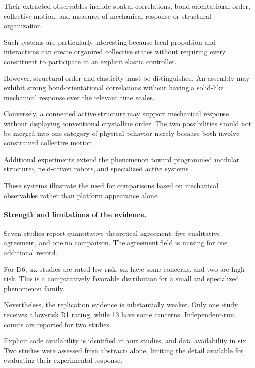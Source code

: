 Their extracted observables
include spatial
correlations,
bond-orientational order,
collective motion,
and measures of
mechanical response
or structural
organization.

Such systems are
particularly interesting
because local propulsion
and interactions
can create organized
collective states
without requiring
every constituent
to participate
in an explicit
elastic controller.

However, structural
order and elasticity
must be distinguished.
An assembly may
exhibit strong
bond-orientational
correlations without
having a solid-like
mechanical response
over the relevant
time scales.

Conversely, a connected
active structure
may support
mechanical response
without displaying
conventional crystalline
order. The two
possibilities should
not be merged
into one category
of physical behavior
merely because both
involve constrained
collective motion.

Additional experiments
extend the phenomenon
toward programmed
modular structures,
field-driven robots,
and specialized
active systems
\cite{Zhang2026anisotropicshapesh,Wang2021emergentfielddrive,Bo2026threephasesofodd}.

These systems illustrate
the need for comparisons
based on mechanical
observables rather
than platform
appearance alone.

\paragraph*{Strength and limitations of the evidence.}

Seven studies report
quantitative theoretical
agreement, five
qualitative agreement,
and one no comparison.
The agreement field
is missing for
one additional record.

For D6, six studies
are rated low risk,
six have some concerns,
and two are high risk.
This is a comparatively
favorable distribution
for a small and
specialized phenomenon
family.

Nevertheless, the
replication evidence
is substantially weaker.
Only one study receives
a low-risk D1 rating,
while 13 have
some concerns.
Independent-run counts
are reported for
two studies.

Explicit code availability
is identified in four
studies, and data
availability in six.
Two studies were
assessed from abstracts
alone, limiting
the detail available
for evaluating their
experimental response.

